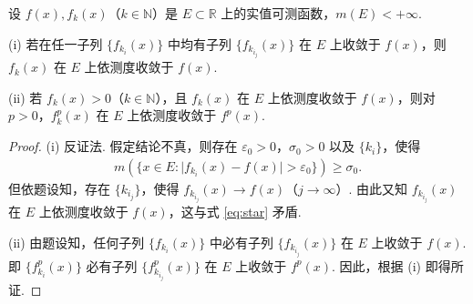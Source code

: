 \documentclass[../../main.tex]{subfiles}%
\begin{document}
\begin{example}
设 $f(x),f_k(x)$（$k\in\mathbb{N}$）是 $E\subset\mathbb{R}$ 上的实值可测函数，$m(E)<+\infty$.

(i) 若在任一子列 $\{f_{k_i}(x)\}$ 中均有子列 $\{f_{k_{i_j}}(x)\}$ 在 $E$ 上收敛于 $f(x)$，则 $f_k(x)$ 在 $E$ 上依测度收敛于 $f(x)$.

(ii) 若 $f_k(x)>0$（$k\in\mathbb{N}$），且 $f_k(x)$ 在 $E$ 上依测度收敛于 $f(x)$，则对 $p>0$，$f_k^p(x)$ 在 $E$ 上依测度收敛于 $f^p(x)$.
\end{example}
\begin{proof}
(i) 反证法. 假定结论不真，则存在 $\varepsilon_0>0$，$\sigma_0>0$ 以及 $\{k_i\}$，使得
\begin{align}
m(\{x\in E:\vert f_{k_i}(x)-f(x)\vert>\varepsilon_0\})\geqslant\sigma_0.\label{eq:star}
\end{align}
但依题设知，存在 $\{k_{i_j}\}$，使得 $f_{k_{i_j}}(x)\to f(x)$（$j\to\infty$）. 由此又知 $f_{k_{i_j}}(x)$ 在 $E$ 上依测度收敛于 $f(x)$，这与式 \eqref{eq:star} 矛盾.

(ii) 由题设知，任何子列 $\{f_{k_i}(x)\}$ 中必有子列 $\{f_{k_{i_j}}(x)\}$ 在 $E$ 上收敛于 $f(x)$. 即 $\{f_{k_i}^p(x)\}$ 必有子列 $\{f_{k_{i_j}}^p(x)\}$ 在 $E$ 上收敛于 $f^p(x)$. 因此，根据 (i) 即得所证. 
\end{proof}
\end{document}
